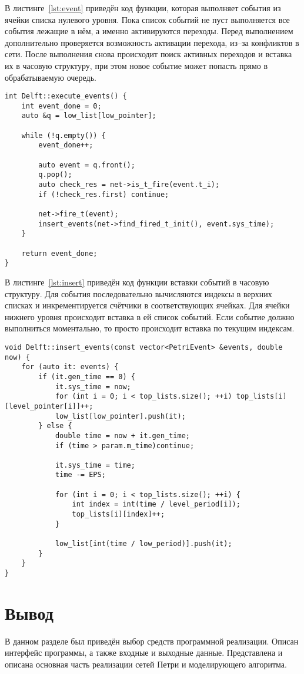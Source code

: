 В листинге~\ref{lst:event} приведён код функции, которая выполняет события из ячейки списка нулевого уровня. Пока список событий не пуст выполняется все события лежащие в нём, а именно активируются переходы. Перед выполнением дополнительно проверяется возможность активации перехода, из--за конфликтов в сети. После выполнения снова происходит поиск активных переходов и вставка их в часовую структуру, при этом новое событие может попасть прямо в обрабатываемую очередь.

\begin{center}
	\captionsetup{justification=raggedright,singlelinecheck=off}
	\begin{lstlisting}[label=lst:event,caption=Функция выполнения событий,showstringspaces=false]
int Delft::execute_events() {
	int event_done = 0;
	auto &q = low_list[low_pointer];
	
	while (!q.empty()) {
		event_done++;
		
		auto event = q.front();
		q.pop();
		auto check_res = net->is_t_fire(event.t_i);
		if (!check_res.first) continue;
		
		net->fire_t(event);
		insert_events(net->find_fired_t_init(), event.sys_time);
	}
	
	return event_done;
}
	\end{lstlisting}
\end{center}
\FloatBarrier


В листинге~\ref{lst:insert} приведён код функции вставки событий в часовую структуру. Для события последовательно вычисляются индексы в верхних списках и инкрементируется счётчики в соответствующих ячейках. Для ячейки нижнего уровня происходит вставка в ей список событий. Если событие должно выполниться моментально, то просто происходит вставка по текущим индексам.

\begin{center}
	\captionsetup{justification=raggedright,singlelinecheck=off}
	\begin{lstlisting}[label=lst:insert,caption=Функция вставки событий,showstringspaces=false]
void Delft::insert_events(const vector<PetriEvent> &events, double now) {
	for (auto it: events) {
		if (it.gen_time == 0) {
			it.sys_time = now;
			for (int i = 0; i < top_lists.size(); ++i) top_lists[i][level_pointer[i]]++;
			low_list[low_pointer].push(it);
		} else {
			double time = now + it.gen_time;
			if (time > param.m_time)continue;
			
			it.sys_time = time;
			time -= EPS;
			
			for (int i = 0; i < top_lists.size(); ++i) {
				int index = int(time / level_period[i]);
				top_lists[i][index]++;
			}
			
			low_list[int(time / low_period)].push(it);
		}
	}
}
	\end{lstlisting}
\end{center}
\FloatBarrier

\section*{Вывод}

В данном разделе был приведён выбор средств программной реализации. Описан интерфейс программы, а также входные и выходные данные. Представлена и описана основная часть реализации сетей Петри и моделирующего алгоритма.
